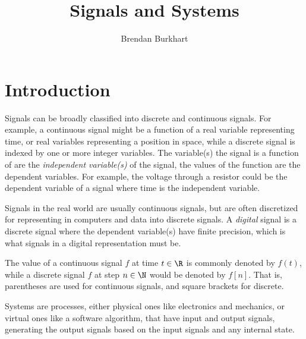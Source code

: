 \documentclass[12pt]{article}
\begin{document}
\title{Signals and Systems}
\author{Brendan Burkhart}
\maketitle

\tableofcontents
\newpage

\section{Introduction}

Signals can be broadly classified into discrete and continuous signals. For example, a continuous signal might be a function of a real variable representing time, or real variables representing a position in space, while a discrete signal is indexed by one or more integer variables. The variable(s) the signal is a function of are the \emph{independent variable(s)} of the signal, the values of the function are the dependent variables. For example, the voltage through a resistor could be the dependent variable of a signal where time is the independent variable.

Signals in the real world are usually continuous signals, but are often discretized for representing in computers and data into discrete signals. A \emph{digital} signal is a discrete signal where the dependent variable(s) have finite precision, which is what signals in a digital representation must be.

The value of a continuous signal $f$ at time $t \in \R$ is commonly denoted by $f(t)$, while a discrete signal $f$ at step $n \in \N$ would be denoted by $f[n]$. That is, parentheses are used for continuous signals, and square brackets for discrete.

Systems are processes, either physical ones like electronics and mechanics, or virtual ones like a software algorithm, that have input and output signals, generating the output signals based on the input signals and any internal state.
\end{document}
